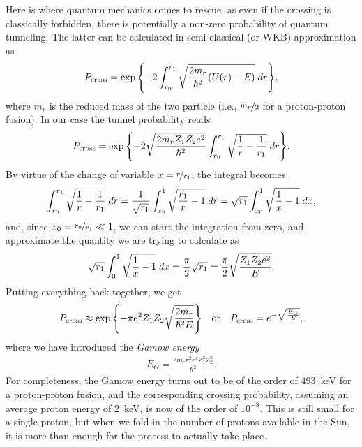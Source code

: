 Here is where quantum mechanics comes to rescue, as even if the crossing is classically
forbidden, there is potentially a non-zero probability of quantum tunneling. The
latter can be calculated in semi-classical (or WKB) approximation as
\begin{align*}
  P_\text{cross} =
  \exp\qty{-2\int_{r_0}^{r_1} \sqrt{\frac{2m_r}{\hbar^2} (U(r) - E)} \ensuremath{\;d{r}}},
\end{align*}
where $m_r$ is the reduced mass of the two particle (i.e., $\nicefrac{m_p}{2}$ for
a proton-proton fusion). In our case the tunnel probability reads
\begin{align*}
  P_\text{cross} = \exp\qty{-2 \sqrt{\frac{2m_r Z_1 Z_2 e^2}{\hbar^2}}
  \int_{r_0}^{r_1} \sqrt{\frac{1}{r} - \frac{1}{r_1}} \ensuremath{\;d{r}}}.
\end{align*}
By virtue of the change of variable $x = \nicefrac{r}{r_1}$, the integral becomes
\begin{align*}
  \int_{r_0}^{r_1} \sqrt{\frac{1}{r} - \frac{1}{r_1}} \;d{r} =
  \frac{1}{\sqrt{r_1}} \int_{x_0}^{1} \sqrt{\frac{r_1}{r} - 1} \;d{r} =
  \sqrt{r_1} \int_{x_0}^{1} \sqrt{\frac{1}{x} - 1} \;d{x},
\end{align*}
and, since $x_0 = \nicefrac{r_0}{r_1} \ll 1$, we can start the integration from zero, and
approximate the quantity we are trying to calculate as
\begin{align*}
  \sqrt{r_1} \int_0^1 \sqrt{\frac{1}{x} - 1} \;d{x} = \frac{\pi}{2} \sqrt{r_1} =
  \frac{\pi}{2} \sqrt{\frac{Z_1 Z_2 e^2}{E}}.
\end{align*}
Putting everything back together, we get
\begin{align}
  P_\text{cross} \approx \exp\qty{-\pi e^2 Z_1 Z_2 \sqrt{\frac{2m_r}{\hbar^2 E}}}
  \quad\text{or}\quad
  P_\text{cross} = e^{-\sqrt{\frac{E_G}{E}}},
\end{align}
where we have introduced the \emph{Gamow energy}
\begin{align}
  E_G = \frac{2m_r \pi^2 e^4 Z_1^2 Z_2^2}{\hbar^2}.
\end{align}
For completeness, the Gamow energy turns out to be of the order of $493$~keV for
a proton-proton fusion, and the corresponding crossing probability, assuming an average
proton energy of 2~keV, is now of the order of $10^{-8}$. This is still small for a
single proton, but when we fold in the number of protons available in the Sun, it
is more than enough for the process to actually take place.

